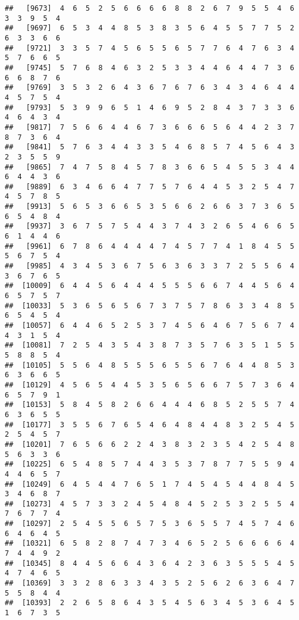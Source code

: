\documentclass[
]{book}
\begin{document}
\begin{verbatim}
##   [9673]  4  6  5  2  5  6  6  6  6  8  8  2  6  7  9  5  5  4  6  3  3  9  5  4
##   [9697]  6  5  3  4  4  8  5  3  8  3  5  6  4  5  5  7  7  5  2  6  3  3  6  6
##   [9721]  3  3  5  7  4  5  6  5  5  6  5  7  7  6  4  7  6  3  4  5  7  6  6  5
##   [9745]  5  7  6  8  4  6  3  2  5  3  3  4  4  6  4  4  7  3  6  6  6  8  7  6
##   [9769]  3  5  3  2  6  4  3  6  7  6  7  6  3  4  3  4  6  4  4  4  5  7  5  4
##   [9793]  5  3  9  9  6  5  1  4  6  9  5  2  8  4  3  7  3  3  6  4  6  4  3  4
##   [9817]  7  5  6  6  4  4  6  7  3  6  6  6  5  6  4  4  2  3  7  8  7  3  6  4
##   [9841]  5  7  6  3  4  4  3  3  5  4  6  8  5  7  4  5  6  4  3  2  3  5  5  9
##   [9865]  7  4  7  5  8  4  5  7  8  3  6  6  5  4  5  5  3  4  4  6  4  4  3  6
##   [9889]  6  3  4  6  6  4  7  7  5  7  6  4  4  5  3  2  5  4  7  4  5  7  8  5
##   [9913]  5  6  5  3  6  6  5  3  5  6  6  2  6  6  3  7  3  6  5  6  5  4  8  4
##   [9937]  3  6  7  5  7  5  4  4  3  7  4  3  2  6  5  4  6  6  5  6  1  4  4  6
##   [9961]  6  7  8  6  4  4  4  4  7  4  5  7  7  4  1  8  4  5  5  5  6  7  5  4
##   [9985]  4  3  4  5  3  6  7  5  6  3  6  3  3  7  2  5  5  6  4  3  6  7  6  5
##  [10009]  6  4  4  5  6  4  4  4  5  5  5  6  6  7  4  4  5  6  4  6  5  7  5  7
##  [10033]  5  3  6  5  6  5  6  7  3  7  5  7  8  6  3  3  4  8  5  6  5  4  5  4
##  [10057]  6  4  4  6  5  2  5  3  7  4  5  6  4  6  7  5  6  7  4  4  3  1  5  4
##  [10081]  7  2  5  4  3  5  4  3  8  7  3  5  7  6  3  5  1  5  5  5  8  8  5  4
##  [10105]  5  5  6  4  8  5  5  5  6  5  5  6  7  6  4  4  8  5  3  6  3  6  6  5
##  [10129]  4  5  6  5  4  4  5  3  5  6  5  6  6  7  5  7  3  6  4  6  5  7  9  1
##  [10153]  5  8  4  5  8  2  6  6  4  4  4  6  8  5  2  5  5  7  4  6  3  6  5  5
##  [10177]  3  5  5  6  7  6  5  4  6  4  8  4  4  8  3  2  5  4  5  2  5  4  5  7
##  [10201]  7  6  5  6  6  2  2  4  3  8  3  2  3  5  4  2  5  4  8  5  6  3  3  6
##  [10225]  6  5  4  8  5  7  4  4  3  5  3  7  8  7  7  5  5  9  4  4  4  6  5  7
##  [10249]  6  4  5  4  4  7  6  5  1  7  4  5  4  5  4  4  8  4  5  3  4  6  8  7
##  [10273]  4  5  7  3  3  2  4  5  4  8  4  5  2  5  3  2  5  5  4  7  6  7  7  4
##  [10297]  2  5  4  5  5  6  5  7  5  3  6  5  5  7  4  5  7  4  6  6  4  6  4  5
##  [10321]  6  5  8  2  8  7  4  7  3  4  6  5  2  5  6  6  6  6  4  7  4  4  9  2
##  [10345]  8  4  4  5  6  6  4  3  6  4  2  3  6  3  5  5  5  4  5  4  7  4  6  5
##  [10369]  3  3  2  8  6  3  3  4  3  5  2  5  6  2  6  3  6  4  7  5  5  8  4  4
##  [10393]  2  2  6  5  8  6  4  3  5  4  5  6  3  4  5  3  6  4  5  1  6  7  3  5

\end{verbatim}
\end{document}
